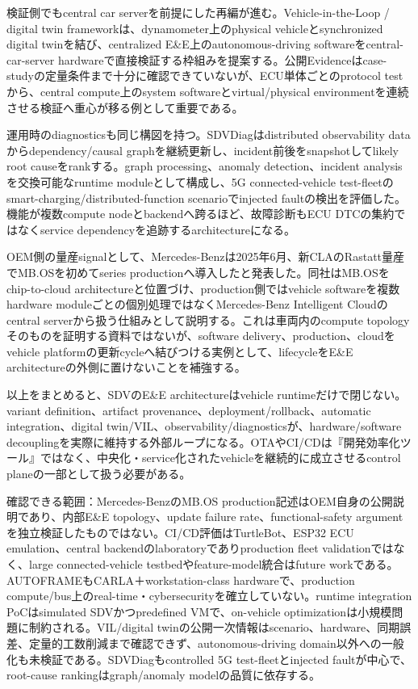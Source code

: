 \begin{surveyarticlebody}
検証側でもcentral car serverを前提にした再編が進む。Vehicle-in-the-Loop / digital twin frameworkは、dynamometer上のphysical vehicleとsynchronized digital twinを結び、centralized E\&E上のautonomous-driving softwareをcentral-car-server hardwareで直接検証する枠組みを提案する。公開Evidenceはcase-studyの定量条件まで十分に確認できていないが、ECU単体ごとのprotocol testから、central compute上のsystem softwareとvirtual/physical environmentを連続させる検証へ重心が移る例として重要である。\autocite{src-d5734e70d075}

運用時のdiagnosticsも同じ構図を持つ。SDVDiagはdistributed observability dataからdependency/causal graphを継続更新し、incident前後をsnapshotしてlikely root causeをrankする。graph processing、anomaly detection、incident analysisを交換可能なruntime moduleとして構成し、5G connected-vehicle test-fleetのsmart-charging/distributed-function scenarioでinjected faultの検出を評価した。機能が複数compute nodeとbackendへ跨るほど、故障診断もECU DTCの集約ではなくservice dependencyを追跡するarchitectureになる。\autocite{src-425ad5d92966}

OEM側の量産signalとして、Mercedes-Benzは2025年6月、新CLAのRastatt量産でMB.OSを初めてseries productionへ導入したと発表した。同社はMB.OSをchip-to-cloud architectureと位置づけ、production側ではvehicle softwareを複数hardware moduleごとの個別処理ではなくMercedes-Benz Intelligent Cloudのcentral serverから扱う仕組みとして説明する。これは車両内のcompute topologyそのものを証明する資料ではないが、software delivery、production、cloudをvehicle platformの更新cycleへ結びつける実例として、lifecycleをE\&E architectureの外側に置けないことを補強する。\autocite{src-76ffc13a4115}

以上をまとめると、SDVのE\&E architectureはvehicle runtimeだけで閉じない。variant definition、artifact provenance、deployment/rollback、automatic integration、digital twin/VIL、observability/diagnosticsが、hardware/software decouplingを実際に維持する外部ループになる。OTAやCI/CDは『開発効率化ツール』ではなく、中央化・service化されたvehicleを継続的に成立させるcontrol planeの一部として扱う必要がある。\autocite{src-425ad5d92966,src-8deb33ac8e08,src-e71ad506dc03}
\end{surveyarticlebody}

\begin{claimboundary}
確認できる範囲：Mercedes-BenzのMB.OS production記述はOEM自身の公開説明であり、内部E\&E topology、update failure rate、functional-safety argumentを独立検証したものではない。CI/CD評価はTurtleBot、ESP32 ECU emulation、central backendのlaboratoryでありproduction fleet validationではなく、large connected-vehicle testbedやfeature-model統合はfuture workである。AUTOFRAMEもCARLA＋workstation-class hardwareで、production compute/bus上のreal-time・cybersecurityを確立していない。runtime integration PoCはsimulated SDVかつpredefined VMで、on-vehicle optimizationは小規模問題に制約される。VIL/digital twinの公開一次情報はscenario、hardware、同期誤差、定量的工数削減まで確認できず、autonomous-driving domain以外への一般化も未検証である。SDVDiagもcontrolled 5G test-fleetとinjected faultが中心で、root-cause rankingはgraph/anomaly modelの品質に依存する。\autocite{src-425ad5d92966,src-8deb33ac8e08,src-9a94bfb0bd47,src-d5734e70d075,src-e71ad506dc03}
\end{claimboundary}
